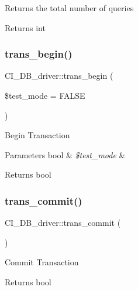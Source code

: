 Returns the total number of queries

\begin{DoxyReturn}{Returns}
int 
\end{DoxyReturn}
\mbox{\label{class_c_i___d_b__driver_a90b3b54bb8ebd75c09e6b20c0dbd44a9}} 
\subsubsection{\texorpdfstring{trans\+\_\+begin()}{trans\_begin()}}
{\footnotesize\ttfamily C\+I\+\_\+\+D\+B\+\_\+driver\+::trans\+\_\+begin (\begin{DoxyParamCaption}\item[{}]{\$test\+\_\+mode = {\ttfamily FALSE} }\end{DoxyParamCaption})}

Begin Transaction


\begin{DoxyParams}[1]{Parameters}
bool & {\em \$test\+\_\+mode} & \\
\hline
\end{DoxyParams}
\begin{DoxyReturn}{Returns}
bool 
\end{DoxyReturn}
\mbox{\label{class_c_i___d_b__driver_aa5c98162d0d8ece97f9013819326b95d}} 
\subsubsection{\texorpdfstring{trans\+\_\+commit()}{trans\_commit()}}
{\footnotesize\ttfamily C\+I\+\_\+\+D\+B\+\_\+driver\+::trans\+\_\+commit (\begin{DoxyParamCaption}{ }\end{DoxyParamCaption})}

Commit Transaction

\begin{DoxyReturn}{Returns}
bool 
\end{DoxyReturn}
\mbox{\label{class_c_i___d_b__driver_ab59892f27ae6d212d1aed5cb67f53d8c}} 
